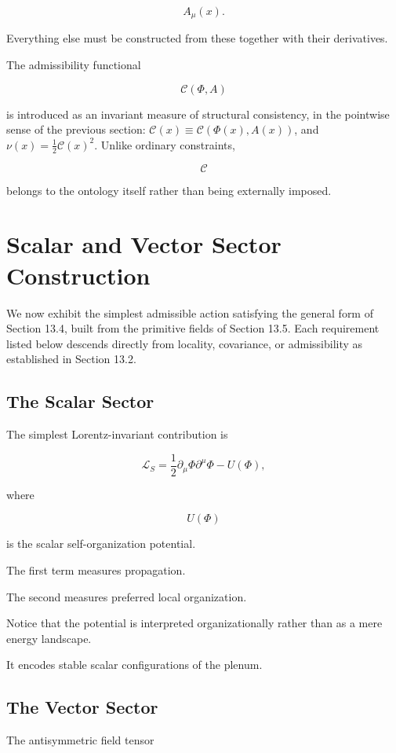 \documentclass[11pt,oneside]{book}
\numberwithin{equation}{chapter}
\theoremstyle{definition}
\theoremstyle{plain}
\begin{document}
\[
A_\mu(x).
\]

Everything else must be constructed from these together with their
derivatives.

The admissibility functional

\[
\mathcal C(\Phi,A)
\]

is introduced as an invariant measure of structural consistency, in the
pointwise sense of the previous section: \(\mathcal C(x)\equiv
\mathcal C(\Phi(x),A(x))\), and \(\nu(x)=\tfrac12\mathcal C(x)^2\). Unlike
ordinary constraints,

\[
\mathcal C
\]

belongs to the ontology itself rather than being externally imposed.

\section{Scalar and Vector Sector Construction}

We now exhibit the simplest admissible action satisfying the general form of
Section 13.4, built from the primitive fields of Section 13.5. Each
requirement listed below descends directly from locality, covariance, or
admissibility as established in Section 13.2.

\subsection*{The Scalar Sector}

The simplest Lorentz-invariant contribution is

\[
\mathcal L_S
=
\frac12
\partial_\mu\Phi
\partial^\mu\Phi
-
U(\Phi),
\]

where

\[
U(\Phi)
\]

is the scalar self-organization potential.

The first term measures propagation.

The second measures preferred local organization.

Notice that the potential is interpreted organizationally rather than as a
mere energy landscape.

It encodes stable scalar configurations of the plenum.

\subsection*{The Vector Sector}

The antisymmetric field tensor
\end{document}
